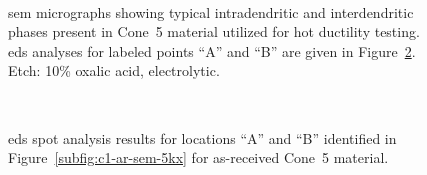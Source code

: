 \begin{figure}
\centering
{} \\
\caption[\Gls{sem} micrographs showing typical intradendritic and interdendritic phases present in as-received Cone~5 material.]{\Gls{sem} micrographs showing typical intradendritic and interdendritic phases present in Cone~5 material utilized for hot ductility testing. \Gls{eds} analyses for labeled points ``A'' and ``B'' are given in Figure~\ref{fig:c5-ar-eds}. Etch: 10\% oxalic acid, electrolytic.}
\label{fig:c5-ar-sem}
\end{figure}

\begin{figure}
\centering
{} \\
\caption[]{\Gls{eds} spot analysis results for locations ``A'' and ``B'' identified in Figure~\ref{subfig:c1-ar-sem-5kx} for as-received Cone~5 material.}
\label{fig:c5-ar-eds}
\end{figure}


